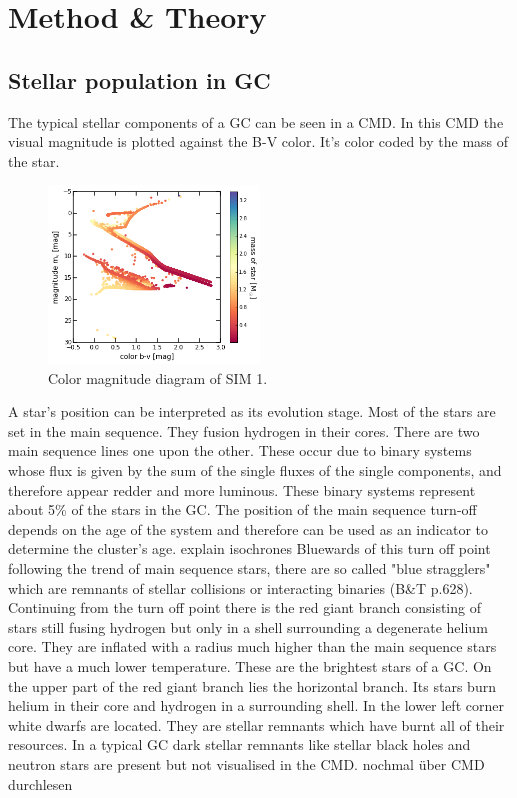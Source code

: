 \section{Method \& Theory}\label{method_theory}
\subsection{Stellar population in GC}\label{cmd_theory}
The typical stellar components of a \ac{GC} can be seen in a \ac{CMD}. In this \ac{CMD} the visual magnitude is plotted against the B-V color. It's color coded by the mass of the star. 
\begin{figure}[htbp]
\centering
	\includegraphics[width=0.5\textwidth]{Plots/color_magnitude_diagram.png}
	\caption{Color magnitude diagram of SIM 1.}
	\label{fig:cmd}
\end{figure}
A star's position can be interpreted as its evolution stage. Most of the stars are set in the main sequence. They fusion hydrogen in their cores. There are two main sequence lines one upon the other. These occur due to binary systems whose flux is given by the sum of the single fluxes of the single components, and therefore appear redder and more luminous. These binary systems represent about 5\% of the stars in the \ac{GC}. The position of the main sequence turn-off depends on the age of the system and therefore can be used as an indicator to determine the cluster's age. \color{red} explain isochrones \color{black} Bluewards of this turn off point following the trend of main sequence stars, there are so called "blue stragglers" which are remnants of stellar collisions or interacting binaries (B\&T p.628). Continuing from the turn off point there is the red giant branch consisting of stars still fusing hydrogen but only in a shell surrounding a degenerate helium core. They are inflated with a radius much higher than the main sequence stars but have a much lower temperature. These are the brightest stars of a \ac{GC}. On the upper part of the red giant branch lies the horizontal branch. Its stars burn helium in their core and hydrogen in a surrounding shell. In the lower left corner white dwarfs are located. They are stellar remnants which have burnt all of their resources. In a typical \ac{GC} dark stellar remnants like stellar black holes and neutron stars are present but not visualised in the \ac{CMD}. \color{red} nochmal über \ac{CMD} durchlesen\color{black} 
